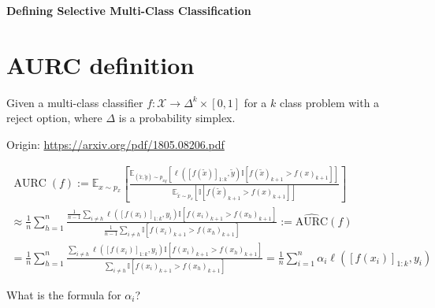 \begin{center}{\noindent\Large\bf Defining Selective Multi-Class Classification}\end{center}

\section{AURC definition}

Given a multi-class classifier $f: \mathcal{X} \rightarrow \Delta^{k} \times [0,1]$ for a $k$ class problem with a reject option, where $\Delta$ is a probability simplex. %

\noindent Origin: \url{https://arxiv.org/pdf/1805.08206.pdf}

\begin{align}
    \operatorname{AURC}(f) := \mathbb{E}_{x \sim p_x} \left[  \frac{\mathbb{E}_{(\tilde{x},\tilde{y})\sim p_{xy}}[\ell([f(\tilde{x})]_{1:k},\tilde{y}) \mathbb{I}[f(\tilde{x})_{k+1} > f(x)_{k+1}]]}{\mathbb{E}_{\tilde{x}\sim p_{x}}[ \mathbb{I}[f(\tilde{x})_{k+1} > f(x)_{k+1}]]} \right] \\
    \approx \frac{1}{n} \sum_{h=1}^n \frac{\frac{1}{n-1} \sum_{i\neq h} \ell([f(x_i)]_{1:k},y_i) \mathbb{I}[f(x_i)_{k+1} > f(x_h)_{k+1}]}{\frac{1}{n-1} \sum_{i\neq h} \mathbb{I}[f(x_i)_{k+1} > f(x_h)_{k+1}]} := \widehat{\mathrm{AURC}}(f) \\
   =\frac{1}{n} \sum_{h=1}^n \frac{ \sum_{i\neq h} \ell([f(x_i)]_{1:k},y_i) \mathbb{I}[f(x_i)_{k+1} > f(x_h)_{k+1}]}{ \sum_{i\neq h} \mathbb{I}[f(x_i)_{k+1} > f(x_h)_{k+1}]} = \frac{1}{n} \sum_{i=1}^n \alpha_i \ell([f(x_i)]_{1:k},y_i)
\end{align}

What is the formula for $\alpha_i$?  \\

